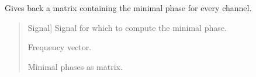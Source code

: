 \documentclass[letterpaper,10pt,english]{sphinxmanual}
\begin{document}
\begin{fulllineitems}
\label{\detokenize{modules/dsptoolbox.standard_functions:dsptoolbox.standard_functions.minimal_phase}}
\pysigstartsignatures
{}
\pysigstopsignatures
\sphinxAtStartPar
Gives back a matrix containing the minimal phase for every channel.
\begin{quote}\begin{description}
\begin{description}
\sphinxlineitem{\sphinxstylestrong{signal}}{[}Signal{]}
\sphinxAtStartPar
Signal for which to compute the minimal phase.

\end{description}

\begin{description}
\sphinxlineitem{\sphinxstylestrong{f}}{[}\sphinxtitleref{np.ndarray}{]}
\sphinxAtStartPar
Frequency vector.

\sphinxlineitem{\sphinxstylestrong{min\_phases}}{[}\sphinxtitleref{np.ndarray}{]}
\sphinxAtStartPar
Minimal phases as matrix.

\end{description}

\end{description}\end{quote}

\end{fulllineitems}

\end{document}
